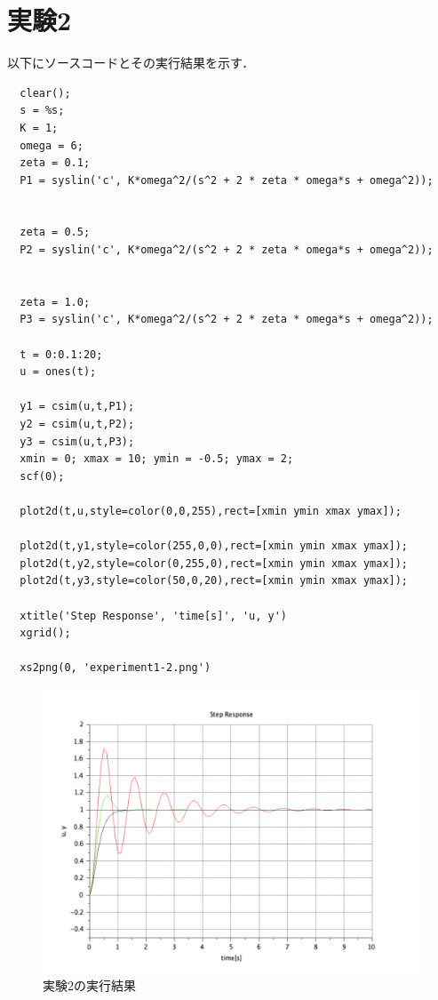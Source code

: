 \documentclass[a4paper,11pt]{jsarticle}
\begin{document}


\section{実験2}
以下にソースコードとその実行結果を示す．
\begin{lstlisting}
  clear();
  s = %s;
  K = 1;
  omega = 6;
  zeta = 0.1;
  P1 = syslin('c', K*omega^2/(s^2 + 2 * zeta * omega*s + omega^2));
  
  
  zeta = 0.5;
  P2 = syslin('c', K*omega^2/(s^2 + 2 * zeta * omega*s + omega^2));
  
  
  zeta = 1.0;
  P3 = syslin('c', K*omega^2/(s^2 + 2 * zeta * omega*s + omega^2));
  
  t = 0:0.1:20;
  u = ones(t);
  
  y1 = csim(u,t,P1);
  y2 = csim(u,t,P2);
  y3 = csim(u,t,P3);
  xmin = 0; xmax = 10; ymin = -0.5; ymax = 2;
  scf(0);
  
  plot2d(t,u,style=color(0,0,255),rect=[xmin ymin xmax ymax]);
  
  plot2d(t,y1,style=color(255,0,0),rect=[xmin ymin xmax ymax]);
  plot2d(t,y2,style=color(0,255,0),rect=[xmin ymin xmax ymax]);
  plot2d(t,y3,style=color(50,0,20),rect=[xmin ymin xmax ymax]);
  
  xtitle('Step Response', 'time[s]', 'u, y')
  xgrid();
  
  xs2png(0, 'experiment1-2.png')

\end{lstlisting}
\begin{figure}[H]
  \centering
  \includegraphics[width=0.8\linewidth]{picture/experiment1-2.png}
  \caption{実験2の実行結果}
  \label{2}
\end{figure}
\end{document}
